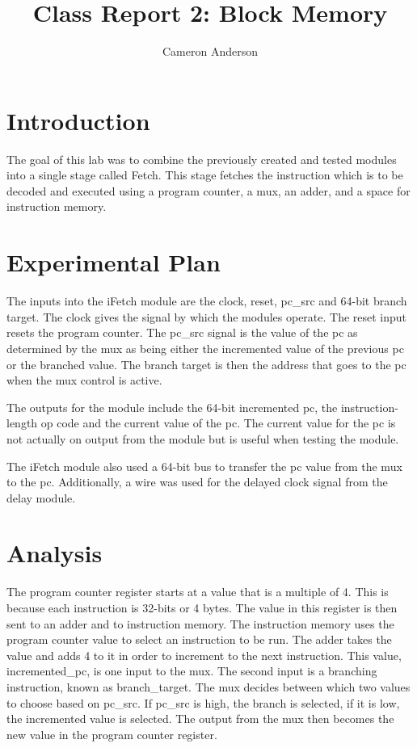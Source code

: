 \documentclass{article}
\author{Cameron Anderson}
\title{Class Report 2: Block Memory}
\begin{document}
\maketitle

\section{Introduction}
The goal of this lab was to combine the previously created and tested modules into a single stage called Fetch. This stage fetches the instruction which is to be decoded and executed using a program counter, a mux, an adder, and a space for instruction memory.

\section{Experimental Plan}
The inputs into the iFetch module are the clock, reset, pc\_src and 64-bit branch target. The clock gives the signal by which the modules operate. The reset input resets the program counter. The pc\_src signal is the value of the pc as determined by the mux as being either the incremented value of the previous pc or the branched value.  The branch target is then the address that goes to the pc when the mux control is active.
     
The outputs for the module include the 64-bit incremented pc, the instruction-length op code and the current value of the pc. The current value for the pc is not actually on output from the module but is useful when testing the module. 

The iFetch module also used a 64-bit bus to transfer the pc value from the mux to the pc. Additionally, a wire was used for the delayed clock signal from the delay module.

\section{Analysis}
The program counter register starts at a value that is a multiple of 4. This is because each instruction is 32-bits or 4 bytes. The value in this register is then sent to an adder and to instruction memory. The instruction memory uses the program counter value to select an instruction to be run. The adder takes the value and adds 4 to it in order to increment to the next instruction. This value, incremented\_pc, is one input to the mux. The second input is a branching instruction, known as branch\_target. The mux decides between which two values to choose based on pc\_src. If pc\_src is high, the branch is selected, if it is low, the incremented value is selected. The output from the mux then becomes the new value in the program counter register. 
\end{document}

